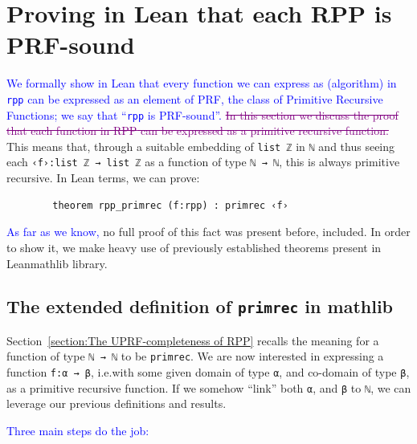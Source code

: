 \documentclass[preprint]{elsarticle}
\theoremstyle{remark}
\newcommand{\RPP}{\textsf{RPP}\xspace}
\newcommand{\PRF}{\textsf{PRF}\xspace}
\newcommand{\MATHLIB}{\textsf{mathlib}\xspace}
\newcommand{\LEAN}{\textsf{Lean}\xspace}
\begin{document}
\section{Proving in \LEAN that each \RPP is \PRF-sound}
\label{section:Each RPP is PRF}

\textcolor{blue}{We formally show in \LEAN that every function we can express as (algorithm) in \lstinline|rpp| can be expressed as an element of \PRF, the class of Primitive Recursive Functions; we say that ``\lstinline|rpp| is \PRF-sound''.}
\textcolor{purple}{\sout{In this section we discuss the proof that each function in \RPP can be expressed as a primitive recursive function.}} This means that, through a suitable embedding of \lstinline|list ℤ| in \lstinline|ℕ| and thus seeing each \lstinline|‹f›:list ℤ → list ℤ| as a function of type \lstinline|ℕ → ℕ|, this is always primitive recursive. In \LEAN terms, we can prove:
\begin{lstlisting}
        theorem rpp_primrec (f:rpp) : primrec ‹f›
\end{lstlisting}
\textcolor{blue}{As far as we know,} no full proof of this fact was present before, \cite{Paolini2018NGC} included. In order to show it, we make heavy use of previously established theorems present in \LEAN \MATHLIB library.

\subsection{The extended definition of {\normalfont \texttt{primrec}} in {\normalfont \MATHLIB}}
Section~\ref{section:The UPRF-completeness of RPP} recalls the meaning for a function of type \lstinline|ℕ → ℕ| to be \lstinline|primrec|. We are now interested in expressing a function \lstinline|f:α → β|, i.e.\@ with some given domain of type \lstinline|α|, and co-domain of type \lstinline|β|, as a primitive recursive function. If we somehow ``link'' both \lstinline|α|, and \lstinline|β| to \lstinline|ℕ|, we can leverage our previous definitions and results.


\vspace{\baselineskip}
\noindent
\textcolor{blue}{Three main steps do the job:}
\end{document}
